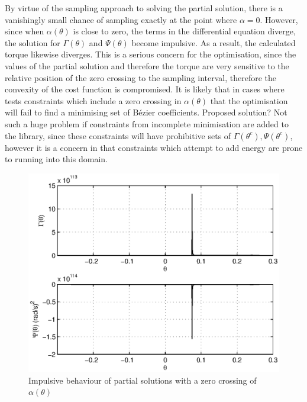  By virtue of the sampling approach to solving the partial solution, there is a vanishingly small chance of sampling exactly at the point where $\alpha=0$. However, since when $\alpha(\theta)$ is close to zero, the terms in the differential equation diverge, the solution for $\Gamma(\theta)$ and $\Psi(\theta)$ become impulsive. As a result, the calculated torque likewise diverges. This is a serious concern for the optimisation, since the values of the partial solution and therefore the torque are very sensitive to the relative position of the zero crossing to the sampling interval, therefore the convexity of the cost function is compromised. It is likely that in cases where  tests constraints which include a zero crossing in $\alpha(\theta)$ that the optimisation will fail to find a minimising set of Bézier coefficients. {\color{orange} Proposed solution? Not such a huge problem if constraints from incomplete minimisation are added to the library, since these constraints will have prohibitive sets of $\Gamma(\theta^c), \Psi(\theta^c)$, however it is a concern in that constraints which attempt to add energy are prone to running into this domain.}
 
\begin{figure}
	\centering
	\includegraphics[width=0.8\linewidth]{4VirtConstLib/GamPsi0Crossing.eps}
	\caption{Impulsive behaviour of partial solutions with a zero crossing of $\alpha(\theta)$}
	\label{fig:divergence0crossing}
\end{figure}